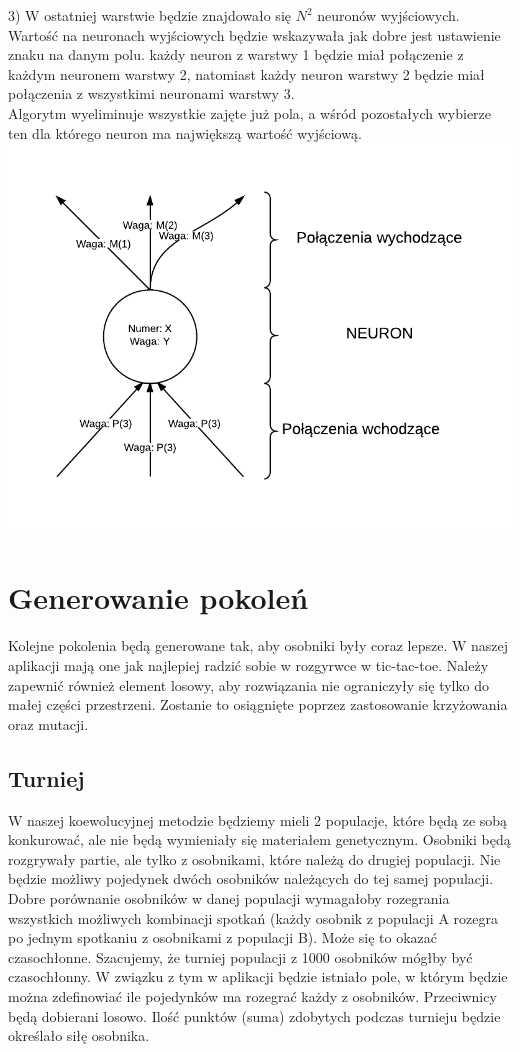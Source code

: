 \documentclass[paper=a4, fontsize=11pt]{scrartcl} %
\numberwithin{equation}{section} %
\numberwithin{figure}{section} %
\numberwithin{table}{section} %
\begin{document}
3) W ostatniej warstwie będzie znajdowało się $N^2$ neuronów wyjściowych. Wartość na neuronach wyjściowych będzie wskazywała jak dobre jest ustawienie znaku na danym polu. 
każdy neuron z warstwy 1 będzie miał połączenie z każdym neuronem warstwy 2, natomiast każdy neuron warstwy 2 będzie miał połączenia z wszystkimi neuronami warstwy 3. \\
Algorytm wyeliminuje wszystkie zajęte już pola, a wśród pozostałych wybierze ten dla którego neuron ma największą wartość wyjściową. \\
\includegraphics[scale=1]{diagrams/CoevolutionaryTicTacToe4} \\

\section{Generowanie pokoleń}
Kolejne pokolenia będą generowane tak, aby osobniki były coraz lepsze. W naszej aplikacji mają one jak najlepiej radzić sobie w rozgyrwce w tic-tac-toe. Należy zapewnić również element losowy, aby rozwiązania nie ograniczyły się tylko do małej części przestrzeni. Zostanie to osiągnięte poprzez zastosowanie krzyżowania oraz mutacji. 

\subsection{Turniej}
W naszej koewolucyjnej metodzie będziemy mieli 2 populacje, które będą ze sobą konkurować, ale nie będą wymieniały się materiałem genetycznym. Osobniki będą rozgrywały partie, ale tylko z osobnikami, które należą do drugiej populacji. Nie będzie możliwy pojedynek dwóch osobników należących do tej samej populacji. Dobre porównanie osobników w danej populacji wymagałoby rozegrania wszystkich możliwych kombinacji spotkań (każdy osobnik z populacji A rozegra po jednym spotkaniu z osobnikami z populacji B). Może się to okazać czasochłonne. Szacujemy, że turniej populacji z 1000 osobników mógłby być czasochłonny. W związku z tym w aplikacji będzie istniało pole, w którym będzie można zdefinowiać ile pojedynków ma rozegrać każdy z osobników. Przeciwnicy będą dobierani losowo. Ilość punktów (suma) zdobytych podczas turnieju będzie określało siłę osobnika.
\end{document}
